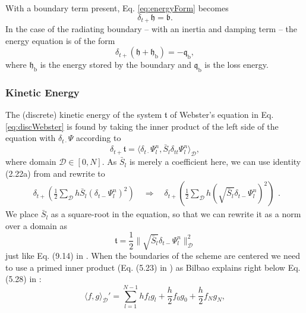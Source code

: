 \documentclass[dvipsnames]{article}
\def\Psiln{\Psi_l^n}
\def\Sbar{\bar S_l}
\def\dtd{\delta_{t\cdot}}
\begin{document}
With a boundary term present, Eq. \eqref{eq:energyForm} becomes
\begin{equation}\label{eq:energyFormBoundary}
    \delta_{t+}\mathfrak{h} = \mathfrak{b}.
\end{equation}
In the case of the radiating boundary -- with an inertia and damping term -- the energy equation is of the form
\begin{equation}\label{eq:radiatingEnergyForm}
    \delta_{t+}(\mathfrak{h}+\mathfrak{h}_\text{b}) = -\mathfrak{q}_\text{b},
\end{equation}
where $\mathfrak{h}_\text{b}$ is the energy stored by the boundary and $\mathfrak{q}_\text{b}$ is the loss energy.
\subsubsection{Kinetic Energy}
The (discrete) kinetic energy of the system $\mathfrak{t}$ of Webster's equation in Eq. \eqref{eq:discWebster} is found by taking the inner product of the left side of the equation with $\dtd\Psi$ according to
\begin{equation}
    \delta_{t+}\mathfrak{t} = \langle\dtd\Psiln,\Sbar \delta_{tt}\Psiln  \rangle_\mathcal{D},
\end{equation}
where domain $\mathcal{D}\in [0, N]$. As $\Sbar$ is merely a coefficient here, we can use identity (2.22a) from \cite{Bilbao2009} and rewrite to
\begin{equation}
    \begin{aligned}
    \delta_{t+}\left(\frac{1}{2}\sum_\mathcal{D}h\Sbar(\delta_{t-}\Psiln)^2\right)\quad \Rightarrow \quad \delta_{t+}\left(\frac{1}{2}\sum_\mathcal{D}h(\sqrt{\Sbar}\delta_{t-}\Psiln)^2\right)
    \end{aligned}.
\end{equation}
We place $\Sbar$ as a square-root in the equation, so that we can rewrite it as a norm over a domain as
\begin{equation}
    \mathfrak{t} = \frac{1}{2}\lVert\sqrt{\bar S_l}\delta_{t-}\Psiln\rVert_\mathcal{D}^2
\end{equation}
just like Eq. (9.14) in \cite{Bilbao2009}. When the boundaries of the scheme are centered we need to use a primed inner product (Eq. (5.23) in \cite{Bilbao2009}) as Bilbao explains right below Eq. (5.28) in \cite{Bilbao2009}:
\begin{equation}\label{eq:primedInnerProduct}
    \langle f,g \rangle_{\mathcal{D}}'= \sum_{l = 1}^{N-1}hf_lg_l + \frac{h}{2}f_0g_0 + \frac{h}{2}f_Ng_N,
\end{equation} 
\end{document}
